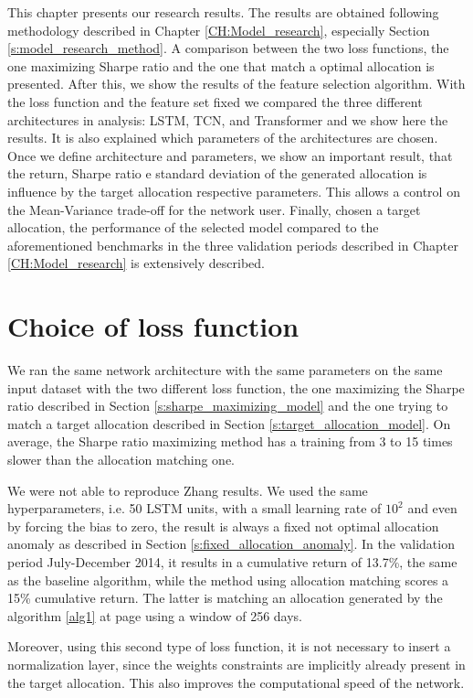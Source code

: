 This chapter presents our research results. The results are obtained following methodology described in Chapter \ref{CH:Model_research}, especially Section \ref{s:model_research_method}. A comparison between the two loss functions, the one maximizing Sharpe ratio and the one that match a optimal allocation is presented. After this, we show the results of the feature selection algorithm. With the loss function and the feature set fixed we compared the three different architectures in analysis: LSTM, TCN, and Transformer and we show here the results. It is also explained which parameters of the architectures are chosen. Once we define architecture and parameters, we show an important result, that the return, Sharpe ratio e standard deviation of the generated allocation is influence by the target allocation respective parameters. This allows a control on the Mean-Variance trade-off for the network user. Finally, chosen a target allocation, the performance of the selected model compared to the aforementioned benchmarks in the three validation periods described in Chapter \ref{CH:Model_research} is extensively described.

\section{Choice of loss function}
We ran the same network architecture with the same parameters on the same input dataset with the two different loss function, the one maximizing the Sharpe ratio described in Section \ref{s:sharpe_maximizing_model} and the one trying to match a target allocation described in Section \ref{s:target_allocation_model}.
On average, the Sharpe ratio maximizing method has a training from 3 to 15 times slower than the allocation matching one. 

We were not able to reproduce Zhang \cite{Zhang_2020} results. We used the same hyperparameters, i.e. 50 LSTM units, with a small learning rate of $10^2$ and even by forcing the bias to zero, the result is always a fixed not optimal allocation anomaly as described in Section \ref{s:fixed_allocation_anomaly}. In the validation period July-December 2014, it results in a cumulative return of 13.7\%, the same as the baseline algorithm, while the method using allocation matching scores a 15\% cumulative return. The latter is matching an allocation generated by the algorithm \ref{alg1} at page \pageref{alg1} using a window of 256 days. 

\hfill \break

Moreover, using this second type of loss function, it is not necessary to insert a normalization layer, since the weights constraints are implicitly already present in the target allocation. This also improves the computational speed of the network.

